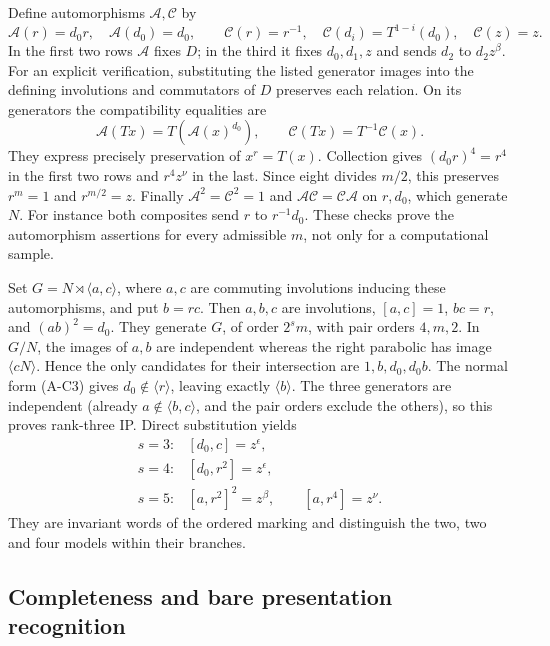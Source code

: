 Define automorphisms \(\mathcal A,\mathcal C\) by \[
 \mathcal A(r)=d_0r,\quad \mathcal A(d_0)=d_0,\qquad
 \mathcal C(r)=r^{-1},\quad
 \mathcal C(d_i)=T^{1-i}(d_0),\quad\mathcal C(z)=z.
\] In the first two rows \(\mathcal A\) fixes \(D\); in the third it fixes \(d_0,d_1,z\) and sends \(d_2\) to \(d_2z^\beta\). For an explicit verification, substituting the listed generator images into the defining involutions and commutators of \(D\) preserves each relation. On its generators the compatibility equalities are \[
 \mathcal A(Tx)=T(\mathcal A(x)^{d_0}),\qquad
 \mathcal C(Tx)=T^{-1}\mathcal C(x).
\] They express precisely preservation of \(x^r=T(x)\). Collection gives \((d_0r)^4=r^4\) in the first two rows and \(r^4z^\nu\) in the last. Since eight divides \(m/2\), this preserves \(r^m=1\) and \(r^{m/2}=z\). Finally \(\mathcal A^2=\mathcal C^2=1\) and \(\mathcal A\mathcal C=\mathcal C\mathcal A\) on \(r,d_0\), which generate \(N\). For instance both composites send \(r\) to \(r^{-1}d_0\). These checks prove the automorphism assertions for every admissible \(m\), not only for a computational sample.

Set \(G=N\rtimes\langle a,c\rangle\), where \(a,c\) are commuting involutions inducing these automorphisms, and put \(b=rc\). Then \(a,b,c\) are involutions, \([a,c]=1\), \(bc=r\), and \((ab)^2=d_0\). They generate \(G\), of order \(2^s m\), with pair orders \(4,m,2\). In \(G/N\), the images of \(a,b\) are independent whereas the right parabolic has image \(\langle cN\rangle\). Hence the only candidates for their intersection are \(1,b,d_0,d_0b\). The normal form (A-C3) gives \(d_0\notin\langle r\rangle\), leaving exactly \(\langle b\rangle\). The three generators are independent (already \(a\notin\langle b,c\rangle\), and the pair orders exclude the others), so this proves rank-three IP. Direct substitution yields \[
 \begin{array}{ll}
 s=3:&[d_0,c]=z^\epsilon,\\
 s=4:&[d_0,r^2]=z^\epsilon,\\
 s=5:&[a,r^2]^2=z^\beta,\qquad[a,r^4]=z^\nu.
 \end{array}                                                   \tag{A-C4}
\] They are invariant words of the ordered marking and distinguish the two, two and four models within their branches.

\subsection{Completeness and bare presentation recognition}\label{completeness-and-bare-presentation-recognition}

